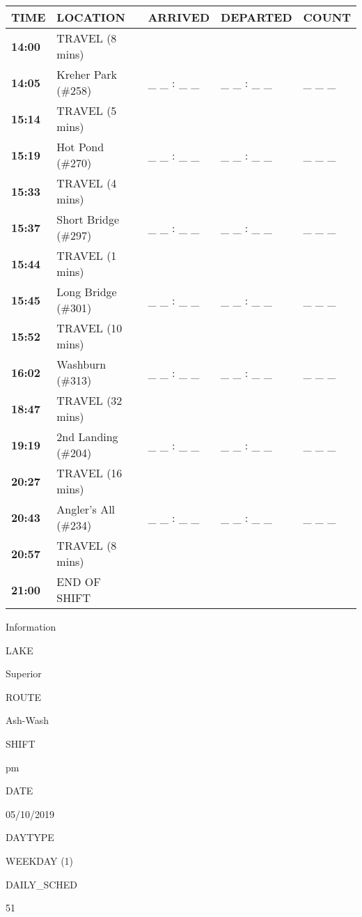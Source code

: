 \documentclass[]{article}
\begin{document}
\begin{tabular}{>{\bfseries}lllll}
\toprule
\textbf{TIME} & \textbf{LOCATION} & \textbf{ARRIVED} & \textbf{DEPARTED} & \textbf{COUNT}\\
\midrule
14:00 & TRAVEL (8 mins) &  &  & \\
14:05 & Kreher Park (\#258) & \_ \_ : \_ \_ & \_ \_ : \_ \_ & \_ \_ \_\\
15:14 & TRAVEL (5 mins) &  &  & \\
15:19 & Hot Pond (\#270) & \_ \_ : \_ \_ & \_ \_ : \_ \_ & \_ \_ \_\\
15:33 & TRAVEL (4 mins) &  &  & \\
15:37 & Short Bridge (\#297) & \_ \_ : \_ \_ & \_ \_ : \_ \_ & \_ \_ \_\\
15:44 & TRAVEL (1 mins) &  &  & \\
15:45 & Long Bridge (\#301) & \_ \_ : \_ \_ & \_ \_ : \_ \_ & \_ \_ \_\\
15:52 & TRAVEL (10 mins) &  &  & \\
16:02 & Washburn (\#313) & \_ \_ : \_ \_ & \_ \_ : \_ \_ & \_ \_ \_\\
18:47 & TRAVEL (32 mins) &  &  & \\
19:19 & 2nd Landing (\#204) & \_ \_ : \_ \_ & \_ \_ : \_ \_ & \_ \_ \_\\
20:27 & TRAVEL (16 mins) &  &  & \\
20:43 & Angler's All (\#234) & \_ \_ : \_ \_ & \_ \_ : \_ \_ & \_ \_ \_\\
20:57 & TRAVEL (8 mins) &  &  & \\
21:00 & END OF SHIFT &  &  & \\
\bottomrule
\end{tabular}\newpage

Information

LAKE

Superior

ROUTE

Ash-Wash

SHIFT

pm

DATE

05/10/2019

DAYTYPE

WEEKDAY (1)

DAILY\_SCHED

51

\vspace{24pt}
\end{document}
